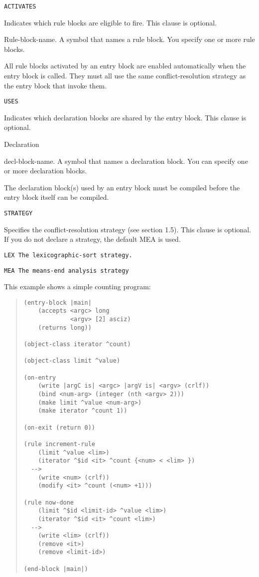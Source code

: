 \tt{ACTIVATES}

Indicates which rule blocks are eligible to fire. This clause
is optional.

Rule-block-name. A symbol that names a rule block. You
specify one or more rule blocks.

All rule blocks activated by an entry block are enabled
automatically when the entry block is called. They must all
use the same conflict-resolution strategy as the entry block
that invoke them.

\tt{USES}

Indicates which declaration blocks are shared by the entry
block. This clause is optional.

Declaration

decl-block-name.  A symbol that names a declaration block.
You can specify one or more declaration blocks.

The declaration block(s) used by an entry block must be
compiled before the entry block itself can be compiled.

\tt{STRATEGY}

Specifies the conflict-resolution strategy (see section 1.5).
This clause is optional. If you do not declare a strategy,
the default MEA is used.

\tt{LEX} The lexicographic-sort strategy.

\tt{MEA}  The means-end analysis strategy

\Example

This example shows a simple counting program:
\begin{quote}
\begin{verbatim}
(entry-block |main|
    (accepts <argc> long
             <argv> [2] asciz)
    (returns long))

(object-class iterator ^count)

(object-class limit ^value)

(on-entry
    (write |argC is| <argc> |argV is| <argv> (crlf))
    (bind <num-arg> (integer (nth <argv> 2)))
    (make limit ^value <num-arg>)
    (make iterator ^count 1))

(on-exit (return 0))

(rule increment-rule
    (limit ^value <lim>)
    (iterator ^$id <it> ^count {<num> < <lim> })
  -->
    (write <num> (crlf))
    (modify <it> ^count (<num> +1)))

(rule now-done
    (limit ^$id <limit-id> ^value <lim>)
    (iterator ^$id <it> ^count <lim>)
  -->
    (write <lim> (crlf))
    (remove <it>)
    (remove <limit-id>)

(end-block |main|)
\end{verbatim}
\end{quote}

